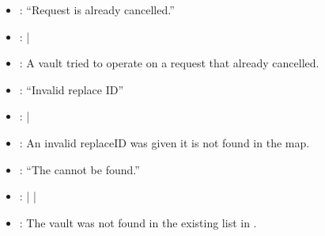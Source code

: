 \documentclass[a4paper,10pt,english]{sphinxmanual}
\begin{document}
\begin{itemize}
\item {} 
: “Request is already cancelled.”

\item {} 
: {\hyperref[\detokenize{spec/replace:executereplace}]{}} | {\hyperref[\detokenize{spec/replace:cancelreplace}]{}}

\item {} 
:  A vault tried to operate on a request that already cancelled.

\end{itemize}

\begin{itemize}
\item {} 
: “Invalid replace ID”

\item {} 
: {\hyperref[\detokenize{spec/replace:executereplace}]{}} | {\hyperref[\detokenize{spec/replace:cancelreplace}]{}}

\item {} 
:  An invalid replaceID was given \sphinxhyphen{} it is not found in the  map.

\end{itemize}

\begin{itemize}
\item {} 
: “The  cannot be found.”

\item {} 
: {\hyperref[\detokenize{spec/replace:requestreplace}]{}} | {\hyperref[\detokenize{spec/replace:acceptreplace}]{}} | {\hyperref[\detokenize{spec/replace:cancelreplace}]{}}

\item {} 
: The vault was not found in the existing  list in .

\end{itemize}
\end{document}
